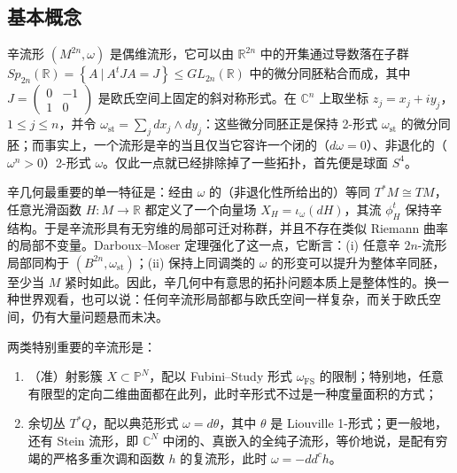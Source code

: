 \documentclass[11pt,a4paper]{article}
\numberwithin{equation}{section}
\newcommand{\bR}{\mathbb{R}}
\newcommand{\bC}{\mathbb{C}}
\newcommand{\bP}{\mathbb{P}}
\newcommand{\st}{\operatorname{st}}
\begin{document}
\subsection{基本概念}

辛流形 $(M^{2n},\omega)$ 是偶维流形，它可以由 $\bR^{2n}$ 中的开集通过导数落在子群 $Sp_{2n}(\bR) = \left\{A \ | \ A^t J A = J \right\} \leq GL_{2n}(\bR)$ 中的微分同胚粘合而成，其中 $J = \left(\begin{array}{cc} 0 & -1 \\ 1 & 0 \end{array} \right)$ 是欧氏空间上固定的斜对称形式。在 $\bC^n$ 上取坐标 $z_j = x_j + iy_j$，$1\leq j \leq n$，并令 $\omega_{\st} = \sum_j dx_j \wedge dy_j$：这些微分同胚正是保持 2-形式 $\omega_{\st}$ 的微分同胚；而事实上，一个流形是辛的当且仅当它容许一个闭的（$d\omega = 0$）、非退化的（$\omega^n > 0$）2-形式 $\omega$。仅此一点就已经排除掉了一些拓扑，首先便是球面 $S^4$。

辛几何最重要的单一特征是：经由 $\omega$ 的（非退化性所给出的）等同 $T^*M \cong TM$，任意光滑函数 $H: M \rightarrow \bR$ 都定义了一个向量场 $X_H = \iota_{\omega}(dH)$，其流 $\phi^t_H$ 保持辛结构。于是辛流形具有无穷维的局部可迁对称群，并且不存在类似 Riemann 曲率的局部不变量。Darboux--Moser 定理强化了这一点，它断言：(i) 任意辛 $2n$-流形局部同构于 $(B^{2n}, \omega_{\st})$；(ii) 保持上同调类的 $\omega$ 的形变可以提升为整体辛同胚，至少当 $M$ 紧时如此。因此，辛几何中有意思的拓扑问题本质上是整体性的。换一种世界观看，也可以说：任何辛流形局部都与欧氏空间一样复杂，而关于欧氏空间，仍有大量问题悬而未决。


两类特别重要的辛流形是：
\begin{enumerate}
\item （准）射影簇 $X \subset \bP^N$，配以 Fubini--Study 形式 $\omega_{\operatorname{FS}}$ 的限制；特别地，任意有限型的定向二维曲面都在此列，此时辛形式不过是一种度量面积的方式；
\item 余切丛 $T^*Q$，配以典范形式 $\omega =d\theta$，其中 $\theta$ 是 Liouville 1-形式；更一般地，还有 Stein 流形，即 $\bC^N$ 中闭的、真嵌入的全纯子流形，等价地说，是配有穷竭的严格多重次调和函数 $h$ 的复流形，此时 $\omega = -dd^ch$。
\end{enumerate}
\end{document}
